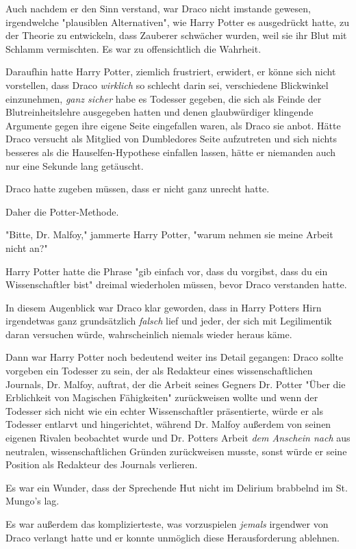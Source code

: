 {Auch nachdem er den Sinn verstand, war Draco nicht imstande gewesen, irgendwelche "plausiblen Alternativen", wie Harry Potter es ausgedrückt hatte, zu der Theorie zu entwickeln, dass Zauberer schwächer wurden, weil sie ihr Blut mit Schlamm vermischten. Es war zu offensichtlich die Wahrheit.

Daraufhin hatte Harry Potter, ziemlich frustriert, erwidert, er könne sich nicht vorstellen, dass Draco \emph{wirklich} so schlecht darin sei, verschiedene Blickwinkel einzunehmen, \emph{ganz sicher} habe es Todesser gegeben, die sich als Feinde der Blutreinheitslehre ausgegeben hatten und denen glaubwürdiger klingende Argumente gegen ihre eigene Seite eingefallen waren, als Draco sie anbot. Hätte Draco versucht als Mitglied von Dumbledores Seite aufzutreten und sich nichts besseres als die Hauselfen-Hypothese einfallen lassen, hätte er niemanden auch nur eine Sekunde lang getäuscht.

Draco hatte zugeben müssen, dass er nicht ganz unrecht hatte.

Daher die Potter-Methode.

"Bitte, Dr. Malfoy," jammerte Harry Potter, "warum nehmen sie meine Arbeit nicht an?"

Harry Potter hatte die Phrase "gib einfach vor, dass du vorgibst, dass du ein Wissenschaftler bist" dreimal wiederholen müssen, bevor Draco verstanden hatte.

In diesem Augenblick war Draco klar geworden, dass in Harry Potters Hirn irgendetwas ganz grundsätzlich \emph{falsch} lief und jeder, der sich mit Legilimentik daran versuchen würde, wahrscheinlich niemals wieder heraus käme.

Dann war Harry Potter noch bedeutend weiter ins Detail gegangen: Draco sollte vorgeben ein Todesser zu sein, der als Redakteur eines wissenschaftlichen Journals, Dr. Malfoy, auftrat, der die Arbeit seines Gegners Dr. Potter "Über die Erblichkeit von Magischen Fähigkeiten" zurückweisen wollte und wenn der Todesser sich nicht wie ein echter Wissenschaftler präsentierte, würde er als Todesser entlarvt und hingerichtet, während Dr. Malfoy außerdem von seinen eigenen Rivalen beobachtet wurde und Dr. Potters Arbeit \emph{dem Anschein nach} aus neutralen, wissenschaftlichen Gründen zurückweisen musste, sonst würde er seine Position als Redakteur des Journals verlieren.

Es war ein Wunder, dass der Sprechende Hut nicht im Delirium brabbelnd im St. Mungo's lag.

Es war außerdem das komplizierteste, was vorzuspielen \emph{jemals} irgendwer von Draco verlangt hatte und er konnte unmöglich diese Herausforderung ablehnen.

}
